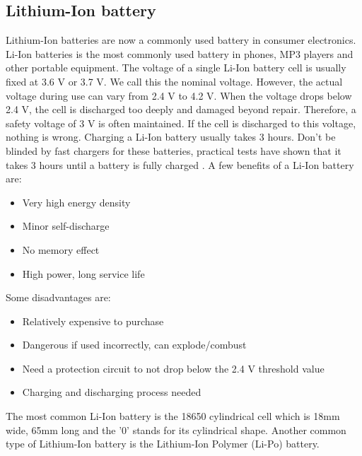 \documentclass[11pt,a4paper]{article}
\begin{document}
\subsection{Lithium-Ion battery}\label{sec:liIon}
Lithium-Ion batteries are now a commonly used battery in consumer electronics. Li-Ion batteries is the most commonly used battery in phones, MP3 players and other portable equipment. The voltage of a single Li-Ion battery cell is usually fixed at 3.6 V or 3.7 V. We call this the nominal voltage. However, the actual voltage during use can vary from 2.4 V to 4.2 V. When the voltage drops below 2.4 V, the cell is discharged too deeply and damaged beyond repair. Therefore, a safety voltage of 3 V is often maintained. If the cell is discharged to this voltage, nothing is wrong. Charging a Li-Ion battery usually takes 3 hours. Don't be blinded by fast chargers for these batteries, practical tests have shown that it takes 3 hours until a battery is fully charged \cite{LiIon_ledscherp}. A few benefits of a Li-Ion battery are:
\begin{itemize}
	\item Very high energy density
	\item Minor self-discharge
	\item No memory effect
	\item High power, long service life
\end{itemize}
Some disadvantages are:
\begin{itemize}
	\item Relatively expensive to purchase
	\item Dangerous if used incorrectly, can explode/combust
	\item Need a protection circuit to not drop below the 2.4 V threshold value
	\item Charging and discharging process needed 
\end{itemize}
The most common Li-Ion battery is the 18650 cylindrical cell which is 18mm wide, 65mm long and the '0' stands for its cylindrical shape. Another common type of Lithium-Ion battery is the Lithium-Ion Polymer (Li-Po) battery.
\end{document}
